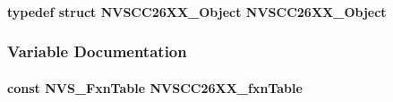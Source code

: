 \paragraph[{N\+V\+S\+C\+C26\+X\+X\+\_\+\+Object}]{\setlength{\rightskip}{0pt plus 5cm}typedef struct {\bf N\+V\+S\+C\+C26\+X\+X\+\_\+\+Object}  {\bf N\+V\+S\+C\+C26\+X\+X\+\_\+\+Object}}\label{_n_v_s_c_c26_x_x_8h_a008a277378544c3ce2b65a2e9688d49e}


\subsubsection{Variable Documentation}
\paragraph[{N\+V\+S\+C\+C26\+X\+X\+\_\+fxn\+Table}]{\setlength{\rightskip}{0pt plus 5cm}const {\bf N\+V\+S\+\_\+\+Fxn\+Table} N\+V\+S\+C\+C26\+X\+X\+\_\+fxn\+Table}\label{_n_v_s_c_c26_x_x_8h_ade3114c185df6a15ec62305dd5c6f6cc}
